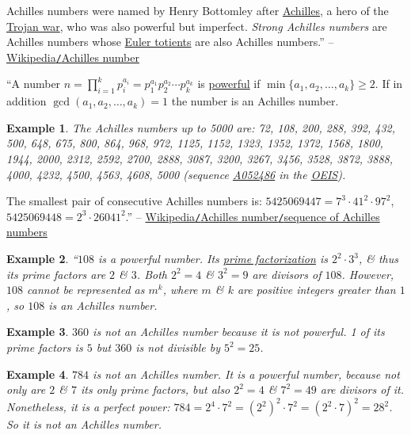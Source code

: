 \documentclass{article}
\newtheorem{example}{Example}
\begin{document}
Achilles numbers were named by Henry Bottomley after \href{https://en.wikipedia.org/wiki/Achilles}{Achilles}, a hero of the \href{https://en.wikipedia.org/wiki/Trojan_war}{Trojan war}, who was also powerful but imperfect. \textit{Strong Achilles numbers} are Achilles numbers whose \href{https://en.wikipedia.org/wiki/Euler_totient}{Euler totients} are also Achilles numbers.'' -- \href{https://en.wikipedia.org/wiki/Achilles_number}{Wikipedia\texttt{/}Achilles number}

``A number $n = \prod_{i=1}^k p_i^{a_i} = p_1^{a_1}p_2^{a_2}\cdots p_k^{a_k}$ is \href{https://en.wikipedia.org/wiki/Powerful_number}{powerful} if $\min\{a_1,a_2,\ldots,a_k\}\ge2$. If in addition $\operatorname{gcd}(a_1,a_2,\ldots,a_k) = 1$ the number is an Achilles number.

\begin{example}
	The Achilles numbers up to 5000 are: \emph{72, 108, 200, 288, 392, 432, 500, 648, 675, 800, 864, 968, 972, 1125, 1152, 1323, 1352, 1372, 1568, 1800, 1944, 2000, 2312, 2592, 2700, 2888, 3087, 3200, 3267, 3456, 3528, 3872, 3888, 4000, 4232, 4500, 4563, 4608, 5000} (sequence \href{https://oeis.org/A052486}{A052486} in the \href{https://en.wikipedia.org/wiki/On-Line_Encyclopedia_of_Integer_Sequences}{OEIS}).
\end{example}
The smallest pair of consecutive Achilles numbers is: $5425069447 = 7^3\cdot41^2\cdot97^2$, $5425069448 = 2^3\cdot26041^2$.'' -- \href{https://en.wikipedia.org/wiki/Achilles_number#Sequence_of_Achilles_numbers}{Wikipedia\texttt{/}Achilles number\texttt{/}sequence of Achilles numbers}

\begin{example}
	``$108$ is a powerful number. Its \href{https://en.wikipedia.org/wiki/Prime_factorization}{prime factorization} is $2^2\cdot3^3$, \& thus its prime factors are $2$ \& $3$. Both $2^2 = 4$ \& $3^2 = 9$ are divisors of $108$. However, $108$ cannot be represented as $m^k$, where $m$ \& $k$ are positive integers greater than $1$, so $108$ is an Achilles number. 
\end{example}

\begin{example}
	$360$ is not an Achilles number because it is not powerful. 1 of its prime factors is $5$ but $360$ is not divisible by $5^2 = 25$.
\end{example}

\begin{example}
	$784$ is not an Achilles number. It is a powerful number, because not only are $2$ \& $7$ its only prime factors, but also $2^2 = 4$ \& $7^2 = 49$ are divisors of it. Nonetheless, it is a perfect power: $784 = 2^4\cdot7^2 = (2^2)^2\cdot7^2 = (2^2\cdot7)^2 = 28^2$. So it is not an Achilles number.
\end{example}
\end{document}
